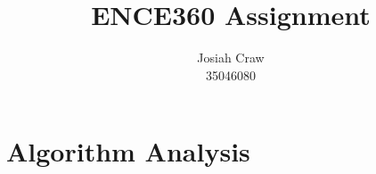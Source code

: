 \documentclass{article}
\author{Josiah Craw\\35046080}
\title{\huge{ENCE360 Assignment}}
\begin{document}
\maketitle

\newpage

\section{Algorithm Analysis}
\end{document}

